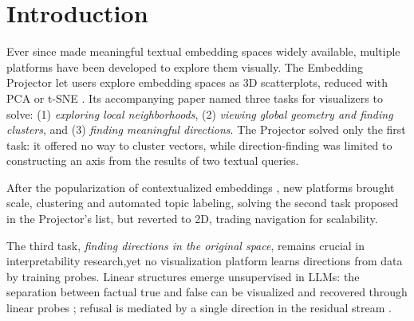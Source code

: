 \documentclass[11pt]{article}
\begin{document}
\section{Introduction}



Ever since \citet{mikolov2013distributed} made meaningful textual embedding spaces widely available, multiple platforms have been developed to explore them visually. The Embedding Projector \cite{smilkov2016embeddingprojectorinteractivevisualization} let users explore embedding spaces as 3D scatterplots, reduced with PCA or t-SNE \cite{van2008visualizing}. Its accompanying paper named three tasks for visualizers to solve: (1) \emph{exploring local neighborhoods}, (2) \emph{viewing global geometry and finding clusters}, and (3) \emph{finding meaningful directions}. The Projector solved only the first task: it offered no way to cluster vectors, while direction-finding was limited to constructing an axis from the results of two textual queries.



After the popularization of contextualized embeddings \cite{devlin2019bertpretrainingdeepbidirectional}, new platforms \cite{wang2023wizmapscalableinteractivevisualization, nomic2022atlas, johnson2024latentscope, ren2025embeddingatlaslowfrictioninteractive} brought scale, clustering and automated topic labeling, solving the second task proposed in the Projector's list, but reverted to 2D, trading navigation for scalability. 



The third task, \textit{finding directions in the original space}, remains crucial in interpretability research,yet no visualization platform learns directions from data by training probes. Linear structures emerge unsupervised in LLMs: the separation between factual true and false can be visualized and recovered through linear probes \cite{Marks2023TheGO}; refusal is mediated by a single direction in the residual stream \cite{arditi2024refusallanguagemodelsmediated}. 
\end{document}
